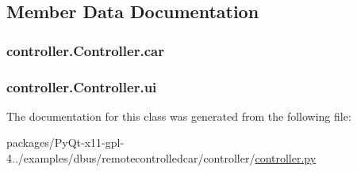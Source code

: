 \subsection{Member Data Documentation}
\hypertarget{classcontroller_1_1Controller_ab694a13d8909ceda2a3e04d82f4352ac}{}
\subsubsection[{car}]{\setlength{\rightskip}{0pt plus 5cm}controller.\+Controller.\+car}\label{classcontroller_1_1Controller_ab694a13d8909ceda2a3e04d82f4352ac}
\hypertarget{classcontroller_1_1Controller_a3c8899257d667c873d706408585f72a6}{}
\subsubsection[{ui}]{\setlength{\rightskip}{0pt plus 5cm}controller.\+Controller.\+ui}\label{classcontroller_1_1Controller_a3c8899257d667c873d706408585f72a6}


The documentation for this class was generated from the following file\+:\begin{DoxyCompactItemize}
\item 
packages/\+Py\+Qt-\/x11-\/gpl-\/4../examples/dbus/remotecontrolledcar/controller/\hyperlink{packages_2PyQt-x11-gpl-4_811_82_2examples_2dbus_2remotecontrolledcar_2controller_2controller_8py}{controller.\+py}\end{DoxyCompactItemize}
